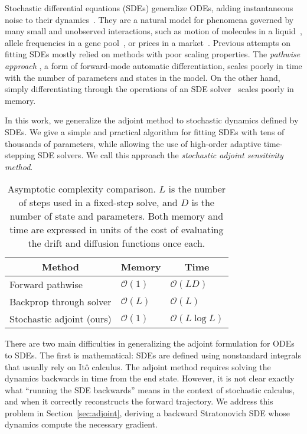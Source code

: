 \documentclass[twoside]{article}
\begin{document}
Stochastic differential equations (SDEs) generalize ODEs, adding instantaneous noise to their dynamics~\cite{oksendal2003stochastic,sarkka2019applied,sarkka2013bayesian}.
They are a natural model for phenomena governed by many small and unobserved interactions, such as motion of molecules in a liquid~\cite{brown1828xxvii}, allele frequencies in a gene pool~\cite{ewens2012mathematical}, or prices in a market~\cite{shreve2004stochastic}.
Previous attempts on fitting SDEs mostly relied on methods with poor scaling properties.
The \textit{pathwise approach} \cite{gobet2005sensitivity,yang1991monte}, 
a form of forward-mode automatic differentiation, scales poorly in time with the number of parameters and states in the model.
On the other hand, simply differentiating through the operations of an SDE solver~\cite{giles2006smoking} scales poorly in memory.

In this work, we generalize the adjoint method to stochastic dynamics defined by SDEs.
We give a simple and practical algorithm for fitting SDEs with tens of thousands of parameters, while allowing the use of high-order adaptive time-stepping SDE solvers. We call this approach the \textit{stochastic adjoint sensitivity method}. 


\begin{table}[h!]
	\setlength{\tabcolsep}{4pt}
	\label{tab:complexity}
	\centering
	\begin{tabular}{lll}
		\toprule
		\multicolumn{1}{c}{Method} & \multicolumn{1}{c}{Memory} & \multicolumn{1}{c}{Time} \\
		\midrule
		Forward pathwise \cite{yang1991monte,gobet2005sensitivity} & $\mathcal{O}(1)$ & $\mathcal{O}(L D)$ \\
		Backprop through solver \cite{giles2006smoking} & $\mathcal{O}(L)$ & $\mathcal{O}(L)$ \\
		{Stochastic adjoint (ours)} & $\mathcal{O}(1)$ & $\mathcal{O}(L \log L)$ \\
		\bottomrule
	\end{tabular}
	\vspace{-1mm}
	\caption{Asymptotic complexity comparison.
		$L$ is the number of steps used in a fixed-step solve, and $D$ is the number of state and parameters.
		Both memory and time are expressed in units of the cost of evaluating the drift and diffusion functions once each.
}
\end{table}


There are two main difficulties in generalizing the adjoint formulation for ODEs to SDEs.
The first is mathematical: 
SDEs are defined using nonstandard integrals that usually rely on It\^o calculus.
The adjoint method requires
solving the dynamics backwards in time from the end state. However, it is not clear exactly what ``running the SDE backwards'' means in the context of stochastic calculus, and when it correctly reconstructs the forward trajectory.
We address this problem in Section~\ref{sec:adjoint}, deriving a backward Stratonovich SDE whose dynamics compute the necessary gradient.
\end{document}

